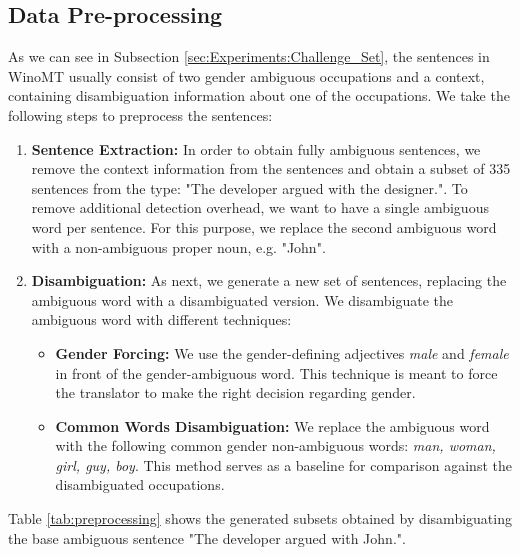 \subsection{Data Pre-processing}

As we can see in Subsection \ref{sec:Experiments:Challenge_Set}, the sentences in WinoMT usually consist of two gender ambiguous occupations and a context, containing disambiguation information about one of the occupations. We take the following steps to preprocess the sentences:

\begin{enumerate}
  \item \textbf{Sentence Extraction:}  
  In order to obtain fully ambiguous sentences, we remove the context information from the sentences and obtain a subset of 335 sentences from the type: "The developer argued with the designer.".
  To remove additional detection overhead, we want to have a single ambiguous word per sentence. For this purpose, we replace the second ambiguous word with a non-ambiguous proper noun, e.g. "John". 
  \item \textbf{Disambiguation:} 
  As next, we generate a new set of sentences, replacing the ambiguous word with a disambiguated version. We disambiguate the ambiguous word with different techniques:
  \begin{itemize}
      \item \textbf{Gender Forcing:} We use the gender-defining adjectives \textit{male} and \textit{female} in front of the gender-ambiguous word. This technique is meant to force the translator to make the right decision regarding gender.
      \item \textbf{Common Words Disambiguation:} We replace the ambiguous word with the following common gender non-ambiguous words: \textit{man, woman, girl, guy, boy}. This method serves as a baseline for comparison against the disambiguated occupations.
  \end{itemize}
\end{enumerate}

Table \ref{tab:preprocessing} shows the generated subsets obtained by disambiguating the base ambiguous sentence "The developer argued with John.".

